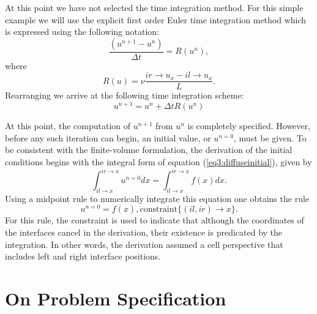 \documentclass[10pt,epsf]{book}
\begin{document}
At this point we have not selected the time integration method.  For
this simple example we will use the explicit first order Euler time
integration method which is expressed using the following notation:
\begin{equation}
\frac{(u^{n+1}-u^{n})}{\Delta t} = R(u^n),
\end{equation}
where
\begin{equation}
R(u) = \nu \frac{{ir \rightarrow u_x - il \rightarrow u_x} }{L}.
\label{eq3:residue}
\end{equation}
Rearranging we arrive at the following time integration scheme:
\begin{equation}
u^{n+1} = u^{n} + \Delta t R(u^n)
\label{eq3:eulerStep}
\end{equation}


At this point, the computation of $u^{n+1}$ from $u^n$ is completely
specified.  However, before any such iteration can begin, an initial
value, or $u^{n=0}$, must be given.  To be consistent with the
finite-volume formulation, the derivation of the initial conditions
begins with the integral form of equation (\ref{eq3:diffuseinitial}),
given by
\begin{equation}
\int^{ir\rightarrow x}_{il\rightarrow x} u^{n=0} dx =
\int^{ir\rightarrow x}_{il\rightarrow x} f(x) dx.
\end{equation}
Using a midpoint rule to numerically integrate this equation one
obtains the rule
\begin{equation}
u^{n=0} = f(x), \mbox{constraint}\lbrace (il,ir)\rightarrow x\rbrace.
\label{eq3:ic}
\end{equation}
For this rule, the constraint is used to indicate that although the
coordinates of the interfaces cancel in the derivation, their
existence is predicated by the integration.  In other words, the
derivation assumed a cell perspective that includes left and right
interface positions.

\section{On Problem Specification}
\end{document}
